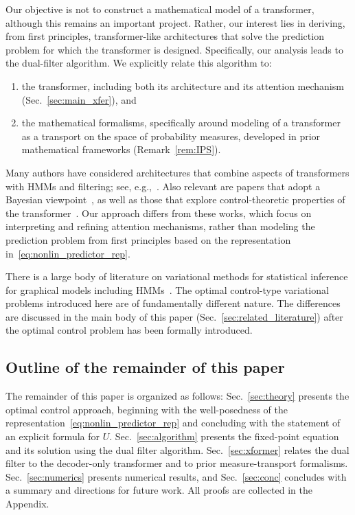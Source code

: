 \documentclass[twoside,11pt]{article}
\def\Sec#1{Sec.~\ref{#1}}
\def\Sec#1{Sec.~\ref{#1}}
\def\Sec#1{Sec~\ref{#1}}
\def\Sec#1{Sec.~\ref{#1}}
\def\Sec#1{Sec.~\ref{#1}}
\begin{document}
Our objective is not to construct a mathematical model of a transformer, although this remains an important project. 
Rather, our interest lies in deriving, from first principles, transformer-like architectures that solve the prediction problem for which the transformer is designed.  Specifically, our analysis leads to the dual-filter algorithm. We explicitly relate this algorithm to: 
\begin{enumerate}
  \item the transformer, including both its architecture and its attention mechanism (\Sec{sec:main_xfer}), and
  \item the mathematical formalisms, specifically around modeling of a transformer as a transport on the space of probability measures, developed in prior mathematical frameworks (Remark~\ref{rem:IPS}).
\end{enumerate}
Many authors have considered architectures that combine aspects of transformers with HMMs and filtering; see, e.g.,~\cite{liu2022masked,tang2021probabilistic,rohekar2023causal,zhang2023hidden,azeraf2021introducing,wang-etal-2018-neural-hidden,wang2021transformer,goel2024can, chen2026belief}. 
Also relevant are papers that adopt a Bayesian viewpoint~\citep{xie2021explanation,han2023explaining,he2024law,ziemann2024state,ren2021combiner,ildiz2024self}, as well as those that explore control-theoretic properties of the transformer~\citep{kong2024aligning,soatto2023taming,liuobservability,bhargava2023s,luo2023prompt}.
Our approach differs from these works, which focus on interpreting and refining attention mechanisms, rather than modeling the prediction problem from first principles based on the representation in~\eqref{eq:nonlin_predictor_rep}.

There is a large body of literature on variational methods for statistical inference for graphical models including HMMs~\citep{jordan1999introduction,barber2011inference,mcgoff2015statistical,bruna2025survey}. 
The optimal control-type variational problems introduced here are of fundamentally
different  nature.  
The  differences are discussed in the main body of this paper (\Sec{sec:related_literature}) after the optimal control problem has been formally introduced.


\subsection{Outline of the remainder of this paper}

The remainder of this paper is organized as follows: 
\Sec{sec:theory} presents the optimal control approach, beginning with the well-posedness of the representation~\eqref{eq:nonlin_predictor_rep} and concluding with the statement of an explicit formula for $U$. 
\Sec{sec:algorithm} presents the fixed-point equation and its solution
using the dual filter algorithm. 
\Sec{sec:xformer} relates the dual filter to the decoder-only transformer and to prior measure-transport formalisms. 
\Sec{sec:numerics} presents numerical results, and \Sec{sec:conc} concludes with a summary and directions for future work. 
All proofs are collected in the Appendix.
\end{document}
